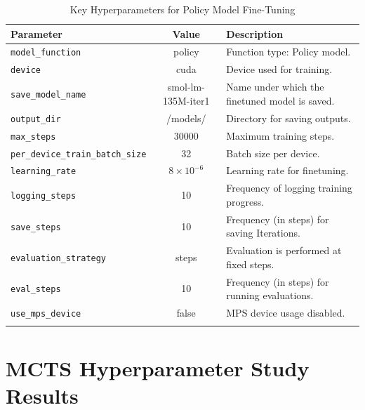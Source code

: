 \documentclass{article}
\begin{document}
\begin{table}[ht]
\centering
\begin{tabular}{@{}l c p{8cm}@{}}
\toprule
\textbf{Parameter}                 & \textbf{Value}                & \textbf{Description} \\ \midrule
\texttt{model\_function}           & policy                        & Function type: Policy model. \\[0.5em]
\texttt{device}                    & cuda                          & Device used for training. \\[0.5em]

\texttt{save\_model\_name}         & smol-lm-135M-iter1            & Name under which the finetuned model is saved. \\[0.5em]
\texttt{output\_dir}               & /models/                      & Directory for saving outputs. \\[0.5em]
\texttt{max\_steps}                & 30000                         & Maximum training steps. \\[0.5em]
\texttt{per\_device\_train\_batch\_size} & 32                     & Batch size per device. \\[0.5em]
\texttt{learning\_rate}            & $8\times10^{-6}$              & Learning rate for finetuning. \\[0.5em]
\texttt{logging\_steps}            & 10                            & Frequency of logging training progress. \\[0.5em]
\texttt{save\_steps}               & 10                            & Frequency (in steps) for saving Iterations. \\[0.5em]
\texttt{evaluation\_strategy}      & steps                         & Evaluation is performed at fixed steps. \\[0.5em]
\texttt{eval\_steps}               & 10                            & Frequency (in steps) for running evaluations. \\[0.5em]
\texttt{use\_mps\_device}           & false                         & MPS device usage disabled. \\[0.5em]
 \\ \bottomrule
\end{tabular}
\caption{Key Hyperparameters for Policy Model Fine-Tuning}
\label{tab:policy-hyperparams}
\end{table}

\clearpage

\section{MCTS Hyperparameter Study Results}
\end{document}
